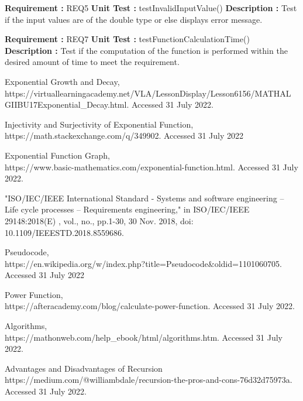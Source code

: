 \documentclass[12pt, a4paper]{article}
\begin{document}
\noindent
\textbf{Requirement : }  REQ5
\newline
\textbf{Unit Test : } testInvalidInputValue()
\newline
\textbf{Description : } Test if the input values are of the double type or else displays error message.
\newline
    
\noindent
\textbf{Requirement : }  REQ7
\newline
\textbf{Unit Test : } testFunctionCalculationTime()
\newline
\textbf{Description : } Test if the computation of the function is performed within the desired amount of time to meet the requirement.
    
\newpage
    
\begin{thebibliography}{20}
	Exponential Growth and Decay,\\
	https://virtuallearningacademy.net/VLA/LessonDisplay/Lesson6156/MATHAL GIIBU17Exponential\_Decay.html. Accessed 31 July 2022.
	
	Injectivity and Surjectivity of Exponential Function,\\
	https://math.stackexchange.com/q/349902. Accessed 31 July 2022
	
	
	Exponential Function Graph,\\
	https://www.basic-mathematics.com/exponential-function.html. Accessed 31 July 2022.
	
	"ISO/IEC/IEEE International Standard - Systems and software engineering -- Life cycle processes -- Requirements engineering," in ISO/IEC/IEEE 29148:2018(E) , vol., no., pp.1-30, 30 Nov. 2018, doi: 10.1109/IEEESTD.2018.8559686.
	
	Pseudocode,\\
	https://en.wikipedia.org/w/index.php?title=Pseudocode\&oldid=1101060705.  Accessed 31 July 2022
	
	Power Function,\\
	https://afteracademy.com/blog/calculate-power-function. Accessed 31 July 2022.
	
	Algorithms,\\
	https://mathonweb.com/help\_ebook/html/algorithms.htm. Accessed 31 July 2022.
	
	Advantages and Disadvantages of Recursion\\
	https://medium.com/@williambdale/recursion-the-pros-and-cons-76d32d75973a. Accessed 31 July 2022.
	 

\end{thebibliography}
\end{document}
